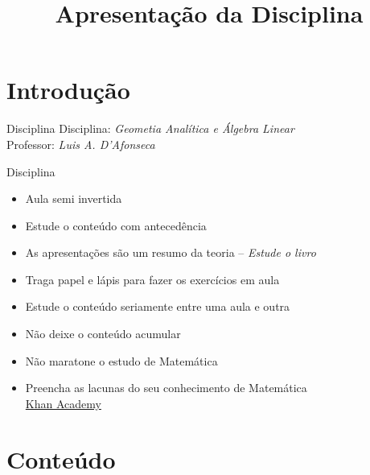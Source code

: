 \documentclass[fleqn,aspectratio=169,12pt]{beamer}
\title{Apresentação da Disciplina}
\begin{document}
\addtitle

\section{Introdução}

\begin{frame}{Disciplina}
   Disciplina: \emph{\large Geometia Analítica e Álgebra Linear}\\[7mm]
   Professor: \emph{\large Luis A. D'Afonseca}
\end{frame}

\begin{frame}{Disciplina}
\begin{itemize}[<+->]
  \item Aula semi invertida
  \item Estude o conteúdo com antecedência
  \item As apresentações são um resumo da teoria -- \emph{Estude o livro}
  \item Traga papel e lápis para fazer os exercícios em aula
  \item Estude o conteúdo seriamente entre uma aula e outra
  \item Não deixe o conteúdo acumular
  \item Não maratone o estudo de Matemática
  \item Preencha as lacunas do seu conhecimento de Matemática \\
        \href{https://pt.khanacademy.org}{Khan Academy}
\end{itemize}
\end{frame}

\section{Conteúdo}
\end{document}
